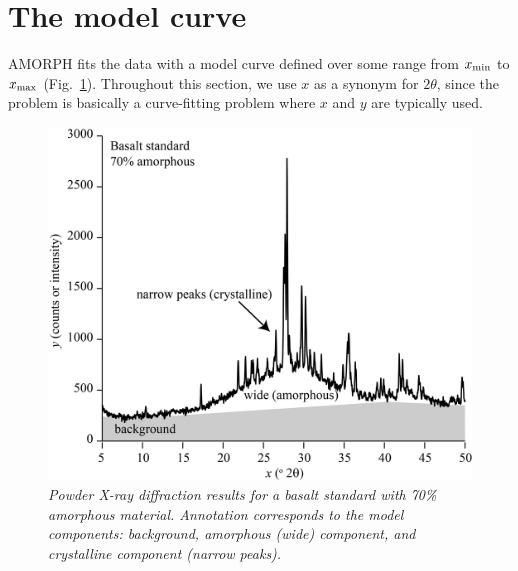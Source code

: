 \documentclass[review]{elsarticle}
\begin{document}
\section{The model curve}\label{sec:model}

AMORPH fits the data with a model curve defined over some range from
$x_{\rm min}$ to $x_{\rm max}$ (Fig.~\ref{fig:example_data2}). Throughout this section, we use
$x$ as a synonym for $2\theta$, since the problem is basically a curve-fitting
problem where $x$ and $y$ are typically used.

\begin{figure}[!ht]
\centering
\includegraphics[width=.7\textwidth]{figures/example_data2.jpg}
\caption{\it Powder X-ray diffraction results for a basalt standard with 70\% amorphous material. Annotation corresponds to the model components: background, amorphous (wide) component, and crystalline component (narrow peaks).\label{fig:example_data2}}
\end{figure}
\end{document}
